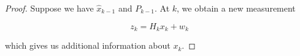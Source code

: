 \documentclass{article}
\begin{document}
        \begin{proof}

            Suppose we have $ \hat{x}_{k-1} $ and $ P_{k-1} $. At $ k $, we obtain
            a new measurement

            \begin{equation*}
                 z_{k} = H_{k} x_{k} + w_{k}
            \end{equation*}

            which gives us additional information about $ x_{k} $.

        \end{proof}
\end{document}
